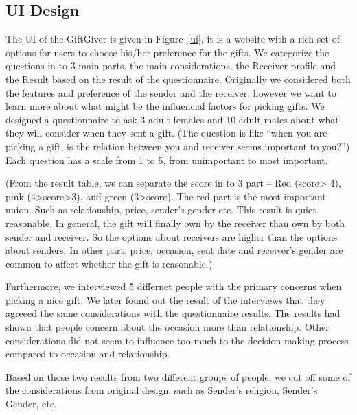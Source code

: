 \documentclass[11pt,twocolumn]{article}
\begin{document}
\subsection{UI Design}
The UI of the GiftGiver is given in Figure~\ref{ui}, it is a website with a rich set of options for users to choose his/her preference for the gifts. We categorize the questions in to 3 main parts, the main considerations, the Receiver profile and the Result based on the result of the questionnaire. Originally we considered both the features and preference of the sender and the receiver, however we want to learn more about what might be the influencial factors for picking gifts.  We designed a questionnaire to ask 3 adult females and 10 adult males about what they will consider when they sent a gift.
(The question is like “when you are picking a gift, is the relation between you and receiver seems important to you?”)   Each question has a scale from 1 to 5, from unimportant to most important.

(From the result table, we can separate the score in to 3 part – Red (score> 4), pink (4>score>3), and green (3>score).  The red part is the most important union.  Such as relationship, price, sender’s gender etc. This result is quiet reasonable.   In general, the gift will finally own by the receiver than own by both sender and receiver.   So the options about receivers are higher than the options about senders.  In other part, price, occasion, sent date and receiver’s gender are common to affect whether the gift is reasonable.)

Furthermore, we interviewed 5 differnet people with the primary concerns when picking a nice gift. We later found out the result of the interviews that they agreeed the same considerations with the questionnaire results. The results had shown that people  concern about the occasion more than relationship.  Other considerations did not seem to influence too much to the decision making process compared to occasion and relationship.

Based on those two results from two different groups of people, we cut off some of the considerations from original design, such as Sender's religion, Sender's Gender, etc.


\end{document}
